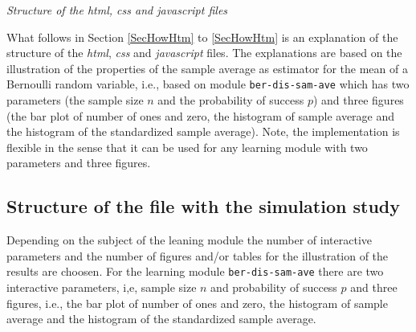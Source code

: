 \documentclass[12pt]{article}
\begin{document}
\vspace{1em}
\noindent\emph{Structure of the \emph{html}, \emph{css} and \emph{javascript} files}

What follows in Section \ref{SecHowHtm} to \ref{SecHowHtm} is an explanation of the structure of the \emph{html}, \emph{css} and \emph{javascript} files.  
%
The explanations are based on the illustration of the properties of the sample average as estimator for the mean of a Bernoulli random variable, i.e., based on module \texttt{ber-dis-sam-ave} which has two parameters (the sample size $n$ and the probability of success $p$) and three figures (the bar plot of number of ones and zero, the histogram of sample average and the histogram of the standardized sample average). 
%
Note, the implementation is flexible in the sense that it can be used for any learning module with two parameters and three figures. 

\subsection{Structure of the file with the simulation study}\label{SecHowSim}


Depending on the subject of the leaning module the number of interactive parameters and the number of figures and/or tables for the illustration of the results are choosen. 
%
For the learning module \texttt{ber-dis-sam-ave} there are two interactive parameters, i,e, sample size $n$ and probability of success $p$ and three figures, i.e., the bar plot of number of ones and zero, the histogram of sample average and the histogram of the standardized sample average. 
\end{document}
